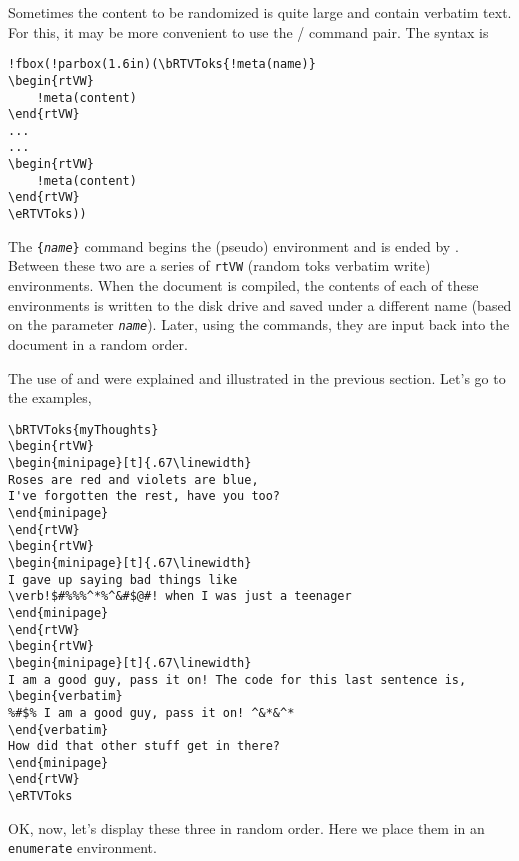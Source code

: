 \documentclass{article}
\def\meta#1{\textit{\texttt{#1}}}
\begin{document}
Sometimes the content to be randomized is quite large and contain verbatim
text. For this, it may be more convenient to use the
/ command pair. The syntax is
\begin{Verbatim}[xleftmargin=20pt,commandchars=!()]
!fbox(!parbox(1.6in)(\bRTVToks{!meta(name)}
\begin{rtVW}
    !meta(content)
\end{rtVW}
...
...
\begin{rtVW}
    !meta(content)
\end{rtVW}
\eRTVToks))
\end{Verbatim}
The \texttt{\{\meta{name}\}} command begins the (pseudo)
environment and is ended by . Between these two are a series
of \texttt{rtVW} (random toks verbatim write) environments. When the document
is compiled, the contents of each of these environments is written to the
disk drive and saved under a different name (based on the parameter
\meta{name}). Later, using the  commands, they are input
back into the document in a random order.

The use of  and  were explained and illustrated
in the previous section. Let's go to the examples,

\begin{Verbatim}[xleftmargin=20pt,commandchars=!()]
\bRTVToks{myThoughts}
\begin{rtVW}
\begin{minipage}[t]{.67\linewidth}
Roses are red and violets are blue,
I've forgotten the rest, have you too?
\end{minipage}
\end{rtVW}
\begin{rtVW}
\begin{minipage}[t]{.67\linewidth}
I gave up saying bad things like
\verb!$#%%%^*%^&#$@#! when I was just a teenager
\end{minipage}
\end{rtVW}
\begin{rtVW}
\begin{minipage}[t]{.67\linewidth}
I am a good guy, pass it on! The code for this last sentence is,
\begin{verbatim}
%#$% I am a good guy, pass it on! ^&*&^*
\end{verbatim}
How did that other stuff get in there?
\end{minipage}
\end{rtVW}
\eRTVToks
\end{Verbatim}
OK, now, let's display these three in random order. Here we place them in
an \texttt{enumerate} environment.
\end{document}
